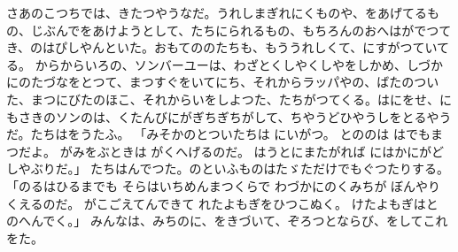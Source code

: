 \documentclass[a4paper,
tate,
book]
{jlreq}
\begin{document}
  さあのこつちでは、きたつやうなだ。うれしまぎれにくものや、をあげてるもの、じぶんでをあけようとして、たちにられるもの、もちろんのおへはがでつてき、のはぴしやんといた。おもてののたちも、もううれしくて、にすがつていてる。
  からからいろの、ソンバーユーは、わざとくしやくしやをしかめ、しづかにのたづなをとつて、まつすぐをいてにち、それからラッパやの、ばたのついた、まつにびたのほこ、それからいをしよつた、たちがつてくる。はにをせ、にもさきのソンのは、くたんびにがぎちぎちがして、ちやうどひやうしをとるやうだ。たちはをうたふ。
「みそかのとついたちは
にいがつ。
とののは
はでもまつだよ。
がみをぶときは
がくへげるのだ。
はうとにまたがれば
にはかにがどしやぶりだ。」
  たちはんでつた。のといふものはたゞただけでもぐつたりする。
「のるはひるまでも
そらはいちめんまつくらで
わづかにのくみちが
ぼんやりくえるのだ。
がこごえてんできて
れたよもぎをひつこぬく。
けたよもぎはと
のへんでく。」
  みんなは、みちのに、をきづいて、ぞろつとならび、をしてこれをた。
\end{document}
